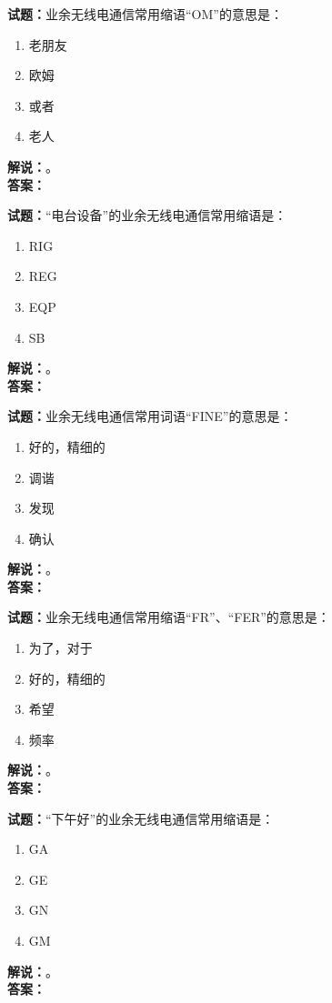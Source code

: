 \documentclass{ctexbook}
\begin{document}
\noindent\textbf{试题：}业余无线电通信常用缩语“OM”的意思是：
\begin{enumerate}[leftmargin=3em]
\item 老朋友
\item 欧姆
\item 或者
\item 老人
\end{enumerate}
\noindent\textbf{解说：}\textbf{}。\\\noindent\textbf{答案：}

\bigskip




\noindent\textbf{试题：}“电台设备”的业余无线电通信常用缩语是：
\begin{enumerate}[leftmargin=3em]
\item RIG
\item REG
\item EQP
\item SB
\end{enumerate}
\noindent\textbf{解说：}\textbf{}。\\\noindent\textbf{答案：}

\bigskip




\noindent\textbf{试题：}业余无线电通信常用词语“FINE”的意思是：
\begin{enumerate}[leftmargin=3em]
\item 好的，精细的
\item 调谐
\item 发现
\item 确认
\end{enumerate}
\noindent\textbf{解说：}\textbf{}。\\\noindent\textbf{答案：}

\bigskip




\noindent\textbf{试题：}业余无线电通信常用缩语“FR”、“FER”的意思是：
\begin{enumerate}[leftmargin=3em]
\item 为了，对于
\item 好的，精细的
\item 希望
\item 频率
\end{enumerate}
\noindent\textbf{解说：}\textbf{}。\\\noindent\textbf{答案：}

\bigskip




\noindent\textbf{试题：}“下午好”的业余无线电通信常用缩语是：
\begin{enumerate}[leftmargin=3em]
\item GA
\item GE
\item GN
\item GM
\end{enumerate}
\noindent\textbf{解说：}\textbf{}。\\\noindent\textbf{答案：}
\end{document}
